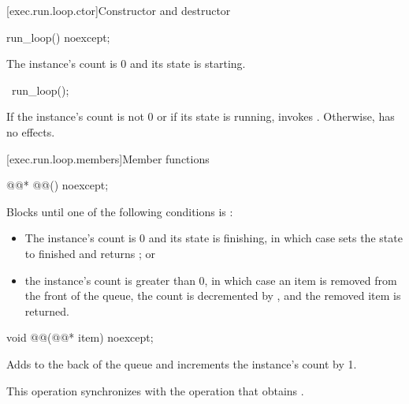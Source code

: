[exec.run.loop.ctor]{Constructor and destructor}

%
\begin{itemdecl}
run_loop() noexcept;
\end{itemdecl}

\begin{itemdescr}
\pnum
\ensures
The  instance's count is 0 and
its state is starting.
\end{itemdescr}

%
\begin{itemdecl}
~run_loop();
\end{itemdecl}

\begin{itemdescr}
\pnum
\effects
If the  instance's count is not 0 or
if its state is running,
invokes .
Otherwise, has no effects.
\end{itemdescr}

[exec.run.loop.members]{Member functions}

\begin{itemdecl}
@@* @@() noexcept;
\end{itemdecl}

\begin{itemdescr}
\pnum
\effects
Blocks until one of the following conditions is :
\begin{itemize}
\item
The  instance's count is 0 and its state is finishing,
in which case  sets the state to finished
and returns ; or
\item
the  instance's count is greater than 0,
in which case an item is removed from the front of the queue,
the count is decremented by , and
the removed item is returned.
\end{itemize}
\end{itemdescr}

\begin{itemdecl}
void @@(@@* item) noexcept;
\end{itemdecl}

\begin{itemdescr}
\pnum
\effects
Adds  to the back of the queue and
increments the  instance's count by 1.

\pnum
\sync
This operation synchronizes with
the  operation that obtains .
\end{itemdescr}

